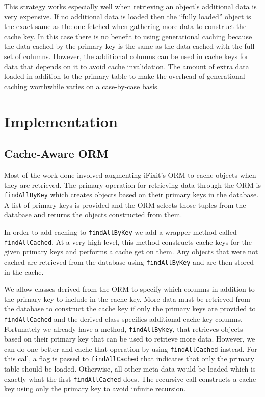 \documentclass[12pt]{ucthesis}
\begin{document}
This strategy works especially well when retrieving an object's additional data is very expensive.
If no additional data is loaded then the ``fully loaded'' object is the exact same as the one fetched when gathering more data to construct the cache key.
In this case there is no benefit to using generational caching because the data cached by the primary key is the same as the data cached with the full set of columns.
However, the additional columns can be used in cache keys for data that depends on it to avoid cache invalidation.
The amount of extra data loaded in addition to the primary table to make the overhead of generational caching worthwhile varies on a case-by-case basis.

\section{Implementation}
\subsection{Cache-Aware ORM}
Most of the work done involved augmenting iFixit's ORM to cache objects when they are retrieved.
The primary operation for retrieving data through the ORM is {\tt findAllByKey} which creates objects based on their primary keys in the database.
A list of primary keys is provided and the ORM selects those tuples from the database and returns the objects constructed from them.

In order to add caching to {\tt findAllByKey} we add a wrapper method called {\tt findAllCached}.
At a very high-level, this method constructs cache keys for the given primary keys and performs a cache get on them.
Any objects that were not cached are retrieved from the database using {\tt findAllByKey} and are then stored in the cache.

We allow classes derived from the ORM to specify which columns in addition to the primary key to include in the cache key.
More data must be retrieved from the database to construct the cache key if only the primary keys are provided to {\tt findAllCached} and the derived class specifies additional cache key columns.
Fortunately we already have a method, {\tt findAllBykey}, that retrieves objects based on their primary key that can be used to retrieve more data.
However, we can do one better and cache that operation by using {\tt findAllCached} instead.
For this call, a flag is passed to {\tt findAllCached} that indicates that only the primary table should be loaded.
Otherwise, all other meta data would be loaded which is exactly what the first {\tt findAllCached} does.
The recursive call constructs a cache key using only the primary key to avoid infinite recursion.
\end{document}
